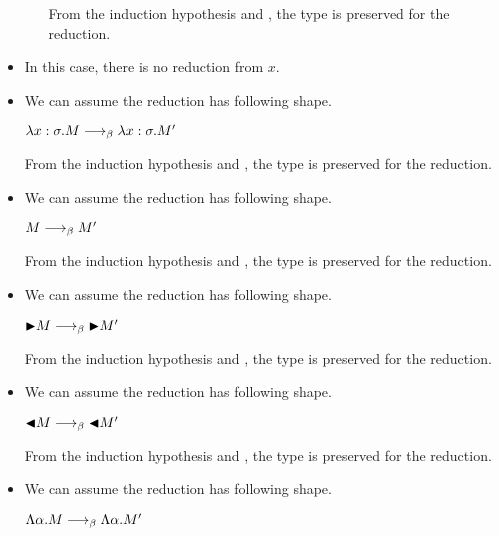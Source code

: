 \begin{itemize}
\begin{itemize}
	      	      From the induction hypothesis and \TApp, the type is preserved for the reduction.
	      \end{itemize}
	      	      
	      \iffullversion
	      	      
	\item \TVar
	      	      
	      In this case, there is no reduction from $x$.
	      	      
	\item \TAbs
	      	      
	      We can assume the reduction has following shape.
	      	      
	      $\lambda x:\sigma.M \longrightarrow_{\beta} \lambda x:\sigma.M'$
	      	      
	      From the induction hypothesis and \TAbs, the type is preserved for the reduction.
	      	      
	      	      
	\item \TConv
	      	      
	      We can assume the reduction has following shape.
	      	      
	      $M \longrightarrow_{\beta} M'$
	      	      
	      From the induction hypothesis and \TConv, the type is preserved for the reduction.
	      	      
	\item \TTB
	      	      
	      We can assume the reduction has following shape.
	      	      
	      ${\mathop{\blacktriangleright}} M \longrightarrow_{\beta} {\mathop{\blacktriangleright}} M'$
	      	      
	      From the induction hypothesis and \TTB, the type is preserved for the reduction.
	      	      
	\item \TTBL
	      	      
	      We can assume the reduction has following shape.
	      	      
	      ${\mathop{\blacktriangleleft}} M \longrightarrow_{\beta} {\mathop{\blacktriangleleft}} M'$
	      	      
	      From the induction hypothesis and \TTBL, the type is preserved for the reduction.
	      	      
	\item \TGen
	      	      
	      We can assume the reduction has following shape.
	      	      
	      $\Lambda\alpha. M \longrightarrow_{\beta} \Lambda\alpha. M'$
	      	      

\end{itemize}
